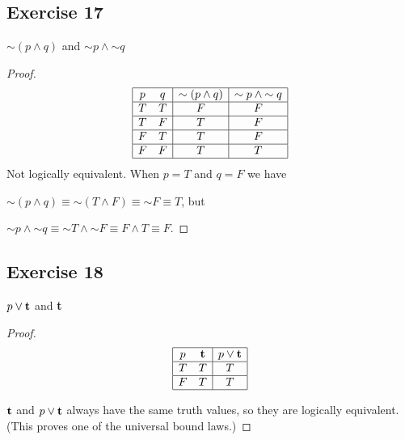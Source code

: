 \documentclass[14pt]{extarticle}
\newcommand{\true}{{\bf t}}
\begin{document}
\subsection{Exercise 17}
${\sim(p \wedge q)}$ and ${\sim p} \wedge {\sim q}$

\begin{proof}
    $$
        \begin{array}{|cc|c|c|}
            \hline
            p & q & {\sim(p \wedge q)} & {\sim p} \wedge {\sim q} \\
            \hline
            T & T & F                  & F                        \\
            \hline
            T & F & T                  & F                        \\
            \hline
            F & T & T                  & F                        \\
            \hline
            F & F & T                  & T                        \\
            \hline
        \end{array}
    $$
    Not logically equivalent. When $p = T$ and $q = F$ we have

    ${\sim (p \wedge q)} \equiv {\sim (T \wedge F)} \equiv {\sim F} \equiv T$, but

    ${\sim p} \wedge {\sim q} \equiv {\sim T \wedge {\sim F}} \equiv F \wedge T \equiv F$.
\end{proof}

\subsection{Exercise 18}
$p \vee \true$ and \true

\begin{proof}
    $$
        \begin{array}{|cc|c|}
            \hline
            p & \true & p \vee \true \\
            \hline
            T & T     & T            \\
            \hline
            F & T     & T            \\
            \hline
        \end{array}
    $$

    $\true$ and $p \vee \true$ always have the same truth values, so they are logically equivalent. (This proves one of the universal bound laws.)

\end{proof}
\end{document}
